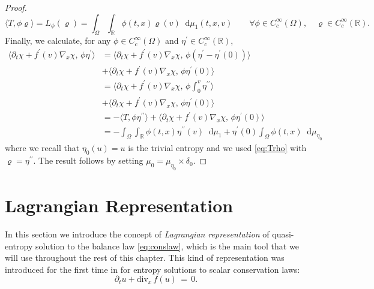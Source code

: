 \documentclass[11pt, twoside, reqno]{amsart}
\theoremstyle{definition}
\theoremstyle{remark}
\numberwithin{equation}{section}
\newcommand*\dif{\mathop{}\!\mathrm{d}}
\newcommand{\second}{{\prime \prime}}
\newcommand{\mr}[1]{\mathrm{#1}}
\begin{document}
\begin{proof}
\begin{equation}\label{eq:Trho}
\langle T, \phi \varrho \rangle = L_\phi(\varrho)= \int_{\Omega} \int_{\mathbb R} \phi(t,x) \varrho(v) \dif \mu_1(t,x,v) \qquad \forall \phi \in C^\infty_c(\Omega), \quad \varrho \in C^\infty_c(\mathbb R).
\end{equation}
Finally, we calculate, for any $\phi \in C^\infty_c(\Omega)$ and $\eta^\prime \in C^\infty_c(\mathbb R)$, 
$$
\begin{aligned}
    \Big\langle \partial_t \chi + f^\prime(v) \nabla_x \chi, \, \phi \eta^\prime\Big\rangle & = \Big\langle \partial_t \chi + f^\prime(v) \nabla_x \chi, \, \phi (\eta^\prime-\eta^\prime(0)) \Big\rangle \\
    & +  \Big\langle \partial_t \chi + f^\prime(v) \nabla_x \chi, \, \phi \eta^\prime(0) \Big\rangle \\
    & = \Big\langle \partial_t \chi + f^\prime(v) \nabla_x \chi, \, \phi \int_0^v \eta^{\second} \Big\rangle \\
    & +  \Big\langle \partial_t \chi + f^\prime(v) \nabla_x \chi, \, \phi \eta^\prime(0) \Big\rangle \\
    & = -\Big\langle T, \phi \eta^\second \Big\rangle  +  \Big\langle \partial_t \chi + f^\prime(v) \nabla_x \chi, \, \phi \eta^\prime(0) \Big\rangle \\
    & = -\int_{\Omega} \int_{\mathbb R} \phi(t,x) \eta^{\second}(v) \dif \mu_1 + \eta^\prime(0) \int_{\Omega} \phi(t,x) \dif \mu_{\eta_0}
\end{aligned}
$$
where we recall that $\eta_0(u) = u$ is the trivial entropy and we used \eqref{eq:Trho} with $\varrho = \eta^{\second}$.
The result follows by setting $\mu_0 =\mu_{\eta_0} \times \delta_0$.
 \end{proof}


\section{Lagrangian Representation}\label{sec:lagrangian}
In this section we introduce the concept of \textit{Lagrangian representation} of quasi-entropy solution to the balance law \eqref{eq:conslaw}, which is the main tool that we will use throughout the rest of this chapter. This kind of representation was introduced for the first time in \cite{BBM_multid} for entropy solutions to scalar conservation laws:
\begin{equation}\label{eq:scld}
\partial_t u + \mr{div}_x \, f(u) \, = \, 0.
\end{equation}
\end{document}
